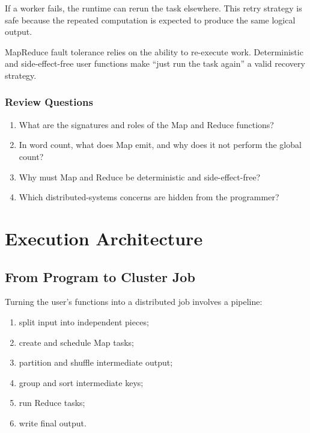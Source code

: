 \documentclass[11pt,a4paper,oneside]{book}
\begin{document}
If a worker fails, the runtime can rerun the task elsewhere. This retry strategy is safe because the repeated computation is expected to produce the same logical output.

\begin{keyconcept}
MapReduce fault tolerance relies on the ability to re-execute work. Deterministic and side-effect-free user functions make ``just run the task again'' a valid recovery strategy.
\end{keyconcept}

\subsubsection*{Review Questions}
\begin{enumerate}
    \item What are the signatures and roles of the Map and Reduce functions?
    \item In word count, what does Map emit, and why does it not perform the global count?
    \item Why must Map and Reduce be deterministic and side-effect-free?
    \item Which distributed-systems concerns are hidden from the programmer?
\end{enumerate}


\section{Execution Architecture}

\subsection{From Program to Cluster Job}

Turning the user's functions into a distributed job involves a pipeline:

\begin{enumerate}
    \item split input into independent pieces;
    \item create and schedule Map tasks;
    \item partition and shuffle intermediate output;
    \item group and sort intermediate keys;
    \item run Reduce tasks;
    \item write final output.
\end{enumerate}
\end{document}
